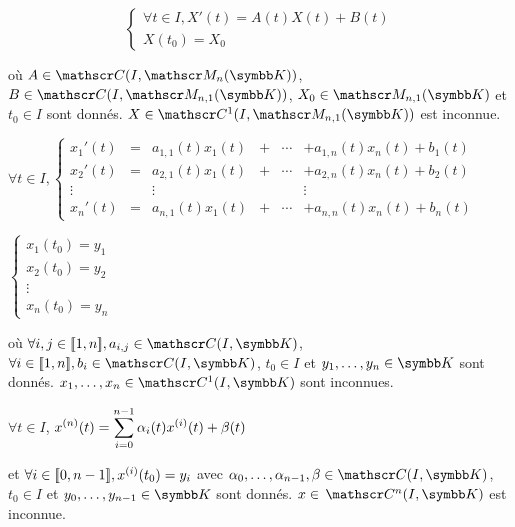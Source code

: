
\svspace $$\begin{cases}
    \forall t \in I, X'(t) = A(t) X(t) + B(t) \\
    X(t_0) = X_0
\end{cases}$$

où $A \in \mathscr C(I, \mathscr M_n(\K))$, $B \in \mathscr C(I, \mathscr M_{n,1}(\K))$,
$X_0 \in \mathscr M_{n,1}(\K)$ et $t_0 \in I$ sont donnés. $X \in \mathscr C^1(I, \mathscr M_{n,1}(\K))$ est inconnue.


\svspace $\forall t \in I, \left\{ \begin{array}{lccccc}
    x_1'(t) & = & a_{1,1}(t)x_1(t) & + & \cdots & + a_{1,n}(t)x_n(t) + b_1(t) \\
    x_2'(t) & = & a_{2,1}(t)x_1(t) & + & \cdots & + a_{2,n}(t)x_n(t) + b_2(t) \\
    \vdots & & \vdots & & & \vdots \\
    x_n'(t) & = & a_{n,1}(t)x_1(t) & + & \cdots & + a_{n,n}(t)x_n(t) + b_n(t)
\end{array} \right.$

$\begin{cases}
    x_1(t_0) = y_1 \\
    x_2(t_0) = y_2 \\
    \vdots \\
    x_n(t_0) = y_n
\end{cases}$

où $\forall i, j \in \ninter{1}{n}, a_{i,j} \in \mathscr C(I, \K)$, $\forall i \in \ninter{1}{n}, b_i \in \mathscr C(I, \K)$,
$t_0 \in I$ et $y_1, \dots, y_n \in \K$ sont donnés. $x_1, \dots, x_n \in \mathscr C^1(I, \K)$ sont inconnues.


\svspace $\forall t \in I$, 
$\displaystyle x^{(n)}(t) = \sum_{i = 0}^{n - 1} \alpha_i(t) x^{(i)}(t) + \beta(t)$

et $\forall i \in [\![0, n - 1]\!], x^{(i)}(t_0) = y_i$ avec 
$\alpha_0, \dots, \alpha_{n-1}, \beta \in \mathscr C(I, \K)$, $t_0 \in I$ et $y_0, \dots, y_{n-1} \in \K$ sont donnés. $x \in \mc n (I, \K)$ est inconnue.

